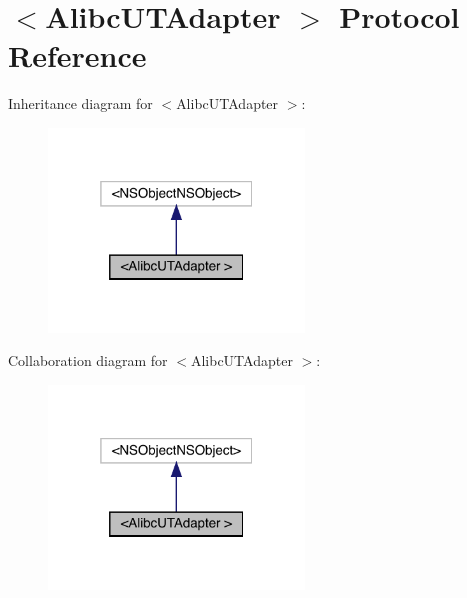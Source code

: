 \hypertarget{protocol_alibc_u_t_adapter_01-p}{}\section{$<$Alibc\+U\+T\+Adapter $>$ Protocol Reference}
\label{protocol_alibc_u_t_adapter_01-p}


Inheritance diagram for $<$Alibc\+U\+T\+Adapter $>$\+:\nopagebreak
\begin{figure}[H]
\begin{center}
\leavevmode
\includegraphics[width=193pt]{protocol_alibc_u_t_adapter_01-p__inherit__graph}
\end{center}
\end{figure}


Collaboration diagram for $<$Alibc\+U\+T\+Adapter $>$\+:\nopagebreak
\begin{figure}[H]
\begin{center}
\leavevmode
\includegraphics[width=193pt]{protocol_alibc_u_t_adapter_01-p__coll__graph}
\end{center}
\end{figure}
